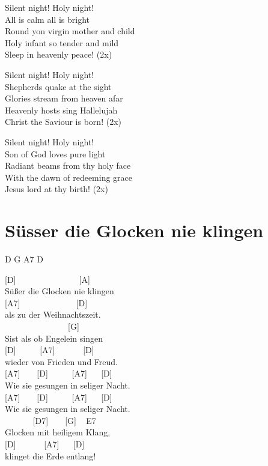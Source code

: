 \documentclass[
  letterpaper,
  twoside=false]{scrbook}
\begin{document}
Silent night! Holy night!\\
All is calm all is bright\\
Round yon virgin mother and child\\
Holy infant so tender and mild\\
Sleep in heavenly peace! (2x)

Silent night! Holy night!\\
Shepherds quake at the sight\\
Glories stream from heaven afar\\
Heavenly hosts sing Hallelujah\\
Christ the Saviour is born! (2x)

Silent night! Holy night!\\
Son of God love\textquotesingle s pure light\\
Radiant beams from thy holy face\\
With the dawn of redeeming grace\\
Jesus lord at thy birth! (2x)

\hypertarget{suxfcsser-die-glocken-nie-klingen}{%
\chapter{Süsser die Glocken nie
klingen}\label{suxfcsser-die-glocken-nie-klingen}}

D G A7 D

{[}D{]} ~ ~ ~ ~ ~ ~ ~ ~ ~{[}A{]}\\
Süßer die Glocken nie klingen\\
{[}A7{]} ~ ~ ~ ~ ~ ~ ~ ~{[}D{]}\\
als zu der Weihnachtszeit.\\
\hspace*{0.333em} ~ ~ ~ ~ ~ ~ ~ ~ ~ {[}G{]}\\
S\textquotesingle ist als ob Engelein singen\\
{[}D{]} ~ ~ ~ {[}A7{]} ~ ~ ~ ~{[}D{]}\\
wieder von Frieden und Freud\textquotesingle.\\
{[}A7{]} ~ ~ {[}D{]} ~ ~ ~ {[}A7{]} ~ ~{[}D{]}\\
Wie sie gesungen in seliger Nacht.\\
{[}A7{]} ~ ~ {[}D{]} ~ ~ ~ {[}A7{]} ~ ~{[}D{]}\\
Wie sie gesungen in seliger Nacht.\\
\hspace*{0.333em} ~ ~ ~ ~ {[}D7{]} ~ ~ {[}G{]} ~ E7\\
Glocken mit heiligem Klang,\\
{[}D{]} ~ ~ ~ ~{[}A7{]} ~ ~{[}D{]}\\
klinget die Erde entlang!
\end{document}
